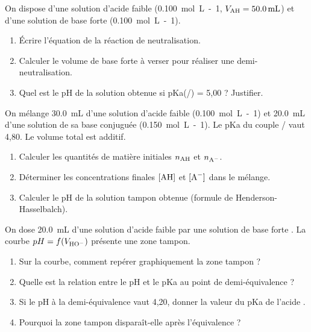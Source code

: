 \documentclass[11pt]{article}
\begin{document}
\begin{exercice}
On dispose d'une solution d'acide faible  (\SI{0,100}{mol.L-1}, $V_{\ce{AH}} = \SI{50,0}{mL}$) et d'une solution de base forte  (\SI{0,100}{mol.L-1}).
\begin{enumerate}
    \item Écrire l'équation de la réaction de neutralisation.
    \item Calculer le volume de base forte à verser pour réaliser une demi-neutralisation.
    \item Quel est le pH de la solution obtenue si pKa(/) = 5,00 ? Justifier.
\end{enumerate}
\end{exercice}

\begin{exercice}
On mélange \SI{30,0}{mL} d'une solution d'acide faible  (\SI{0,100}{mol.L-1}) et \SI{20,0}{mL} d'une solution de sa base conjuguée  (\SI{0,150}{mol.L-1}). Le pKa du couple / vaut 4,80. Le volume total est additif.
\begin{enumerate}
    \item Calculer les quantités de matière initiales $n_{\ce{AH}}$ et $n_{\ce{A-}}$.
    \item Déterminer les concentrations finales $[\ce{AH}]$ et $[\ce{A-}]$ dans le mélange.
    \item Calculer le pH de la solution tampon obtenue (formule de Henderson-Hasselbalch).
\end{enumerate}
\end{exercice}

\begin{exercice}
On dose \SI{20,0}{mL} d'une solution d'acide faible  par une solution de base forte . La courbe $pH = f(V_{\ce{HO-}})$ présente une zone tampon.
\begin{enumerate}
    \item Sur la courbe, comment repérer graphiquement la zone tampon ?
    \item Quelle est la relation entre le pH et le pKa au point de demi-équivalence ?
    \item Si le pH à la demi-équivalence vaut 4,20, donner la valeur du pKa de l'acide .
    \item Pourquoi la zone tampon disparaît-elle après l'équivalence ?
\end{enumerate}
\end{exercice}
\end{document}
